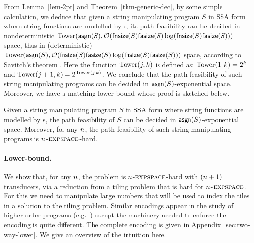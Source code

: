 From Lemma~\ref{lem-2pt} and Theorem~\ref{thm-generic-dec}, by some simple calculation, we deduce that given a string manipulating program $S$ in SSA form where string functions are modelled by \PPT{}s, its path feasibility can be decided in 
nondeterministic $\mathrm{Tower}(\mathsf{asgn}(S), \mathcal{O}(\mathsf{fnsize}(S) \mathsf{fasize}(S) \log(\mathsf{fnsize}(S) \mathsf{fasize}(S)))$ space, thus in (deterministic) $\mathrm{Tower}(\mathsf{asgn}(S), \mathcal{O}(\mathsf{fnsize}(S) \mathsf{fasize}(S) \log(\mathsf{fnsize}(S) \mathsf{fasize}(S)))$ space, according to Savitch's theorem \cite{Savitch70}. Here the function $\mathrm{Tower}(j, k)$ is %
defined as: $\mathrm{Tower}(1, k)= 2^k$ and $\mathrm{Tower}(j+1, k) = 2^{\mathrm{Tower}(j, k)}$. We conclude that the path feasibility of such string manipulating programs  can be decided in $\mathsf{asgn}(S)$-exponential space.
Moreover, we have a matching lower bound whose proof is sketched below.
%
\begin{theorem} \label{thm:two-way}
Given a string manipulating program $S$ in SSA form where string functions are modelled by \PPT{}s, the path feasibility of $S$ can be decided in $\mathsf{asgn}(S)$-exponential space. Moreover,  for any $n$, the path feasibility of such string manipulating programs is  %
 $n$-$\textsc{expspace}$-hard.
\end{theorem}

\paragraph{Lower-bound.}

We show that, for any $n$, the problem is $n$-$\textsc{expspace}$-hard with $(n+1)$ transducers, via a reduction from a tiling problem that is hard for $n$-$\textsc{expspace}$.
For this we need to manipulate large numbers that will be used to index the tiles in a solution to the tiling problem.
Similar encodings appear in the study of higher-order programs (e.g.~\cite{J01,CW07}) except the machinery needed to enforce the encoding is quite different.
The complete encoding is given in 
          {Appendix~\ref{sec:two-way-lower}}.
We give an overview of the intuition here.

